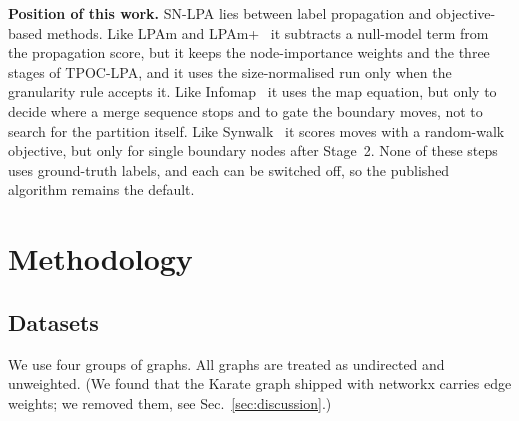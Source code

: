 \documentclass[conference]{IEEEtran}
\begin{document}
\textbf{Position of this work.} SN-LPA lies between label propagation and objective-based methods. Like LPAm and LPAm+~\cite{barber2009,liu2010} it subtracts a null-model term from the propagation score, but it keeps the node-importance weights and the three stages of TPOC-LPA, and it uses the size-normalised run only when the granularity rule accepts it. Like Infomap~\cite{rosvall2008} it uses the map equation, but only to decide where a merge sequence stops and to gate the boundary moves, not to search for the partition itself. Like Synwalk~\cite{toth2022} it scores moves with a random-walk objective, but only for single boundary nodes after Stage~2. None of these steps uses ground-truth labels, and each can be switched off, so the published algorithm remains the default.

\section{Methodology}\label{sec:method}
\subsection{Datasets}\label{sec:data}
We use four groups of graphs. All graphs are treated as undirected and unweighted. (We found that the Karate graph shipped with networkx carries edge weights; we removed them, see Sec.~\ref{sec:discussion}.)
\end{document}
